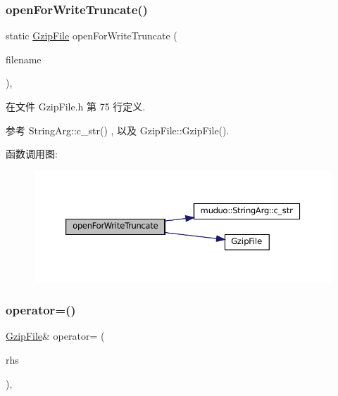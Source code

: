 \subsubsection{\texorpdfstring{open\+For\+Write\+Truncate()}{openForWriteTruncate()}}
{\footnotesize\ttfamily static \hyperlink{classmuduo_1_1GzipFile}{Gzip\+File} open\+For\+Write\+Truncate (\begin{DoxyParamCaption}\item[{\hyperlink{classmuduo_1_1StringArg}{String\+Arg}}]{filename }\end{DoxyParamCaption})\hspace{0.3cm}{\ttfamily [inline]}, {\ttfamily [static]}}



在文件 Gzip\+File.\+h 第 75 行定义.



参考 String\+Arg\+::c\+\_\+str() , 以及 Gzip\+File\+::\+Gzip\+File().

函数调用图\+:
\nopagebreak
\begin{figure}[H]
\begin{center}
\leavevmode
\includegraphics[width=350pt]{classmuduo_1_1GzipFile_ab3ebedf22d289ebd69792c1590035b57_cgraph}
\end{center}
\end{figure}
\mbox{\label{classmuduo_1_1GzipFile_a8dddcc232bc559a7ced99ef5f05689b4}} 
\subsubsection{\texorpdfstring{operator=()}{operator=()}}
{\footnotesize\ttfamily \hyperlink{classmuduo_1_1GzipFile}{Gzip\+File}\& operator= (\begin{DoxyParamCaption}\item[{\hyperlink{classmuduo_1_1GzipFile}{Gzip\+File} \&\&}]{rhs }\end{DoxyParamCaption})\hspace{0.3cm}{\ttfamily [inline]}, {\ttfamily [noexcept]}}



